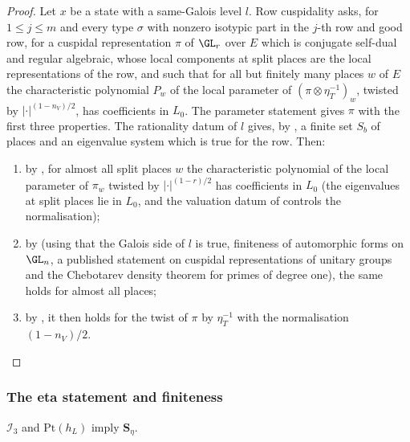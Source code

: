 \begin{proof}
Let $x$ be a state with a same-Galois level $l$. Row cuspidality asks, for $1\le j\le m$ and every type
$\sigma$ with nonzero isotypic part in the $j$-th row and good row, for a cuspidal representation $\pi$ of
$\GL_r$ over $E$ which is conjugate self-dual and regular algebraic, whose local components at split
places are the local representations of the row, and such that for all but finitely many places $w$ of
$E$ the characteristic polynomial $P_w$ of the local parameter of
$(\pi\otimes\eta_T^{-1})_w$, twisted by $|\cdot|^{(1-n_V)/2}$, has coefficients in $L_0$. The parameter
statement gives $\pi$ with the first three properties. The rationality datum of $l$ gives, by
, a finite set $S_b$ of places and an eigenvalue system
which is true for the row. Then:
\begin{enumerate}[label=(\alph*)]
\item by , for almost all split places $w$ the
  characteristic polynomial of the local parameter of $\pi_w$ twisted by $|\cdot|^{(1-r)/2}$ has coefficients in $L_0$ (the
  eigenvalues at split places lie in $L_0$, and the valuation datum of
   controls the
  normalisation);
\item by  (using that the
  Galois side of $l$ is true, finiteness of automorphic forms on $\GL_n$, a published statement on
  cuspidal representations of unitary groups and the
  Chebotarev density theorem for primes of degree one), the same holds for almost all places;
\item by , it then holds for the twist of $\pi$ by
  $\eta_T^{-1}$ with the normalisation $(1-n_V)/2$.\qedhere
\end{enumerate}
\end{proof}

\subsubsection{The eta statement and finiteness}

\begin{proposition}\label{pf:baselat2:eta}
$\mathcal{I}_3$ and $\mathrm{Pt}(h_L)$ imply $\mathbf{S}_{\eta}$.
\end{proposition}

